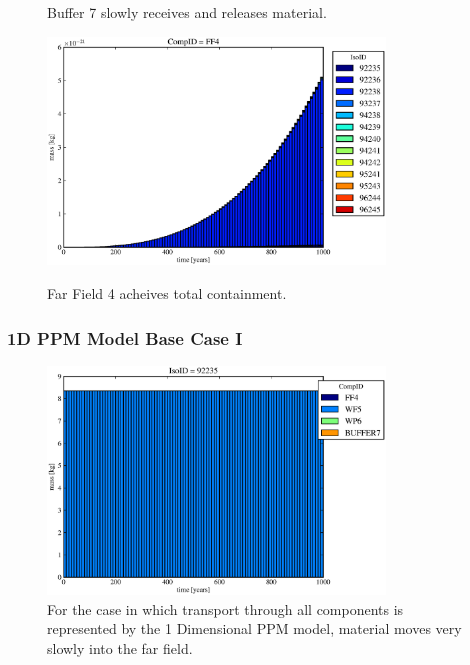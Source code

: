 \begin{frame}
\begin{figure}[ht]
\begin{minipage}[b]{0.45\linewidth}
  \caption[Case ODI Buffer Contaminants]{
    Buffer 7 slowly receives and releases material.
    }
  \includegraphics[width=0.8\textwidth]{./images/od0.eps}
  \caption[Case ODI Far FieldContaminants.]{ 
    Far Field 4 acheives total containment.
    }
  \label{fig:drIVwp6}
  \label{fig:drIVff0}


  \end{minipage}
\end{figure}
\end{frame}

\begin{frame}
\frametitle{1D PPM Model Base Case I}
\begin{figure}[ht]
\centering
\includegraphics[width=0.8\textwidth]{./images/od.eps}
\caption[1 Dimensional PPM Model.]{
For the case in which transport through all components is represented by the 1 
Dimensional PPM model, material moves very slowly into the far field. 
}
\label{fig:odall}
\end{figure}
\end{frame}

